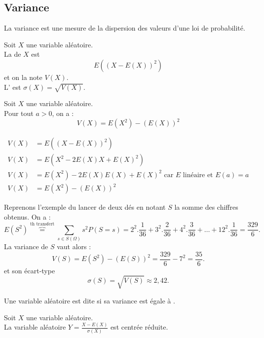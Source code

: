 \documentclass{book}
\begin{document}
\subsection{Variance}
La variance est une mesure de la dispersion des valeurs d'une loi de probabilité.
\begin{Definition}
Soit $X$ une variable aléatoire.\\
La  de $X$ est $$E\left( (X-E(X))^2\right)$$ et on la note $V(X)$.\\
L' est $\sigma(X) =\sqrt{V(X)}$.
\end{Definition}
\begin{Proposition}
Soit $X$ une variable aléatoire.\\
Pour tout $a>0$, on a :
\[ V(X) = E(X^2)-(E(X))^2 \]
\end{Proposition}
\begin{Demonstration}
$$\begin{aligned}
  V(X) &= E\left( (X-E(X))^2\right) \\
  V(X) &= E\left( X^2-2E(X)X + E(X)^2\right)\\
  V(X) &= E(X^2)-2E(X)E(X) + E(X)^2 \text{ car } E \text{ linéaire et }E(a)=a\\
  V(X) &= E(X^2)-(E(X))^2
\end{aligned}$$
\end{Demonstration}




\begin{Exemple}
Reprenons l'exemple du lancer de deux dés en notant $S$ la somme des chiffres obtenus. 
On a :
$$E(S^2 )\overbrace{=}^{\text{th transfert}} \sum_{s\in S (\Omega)} s^2P(S = s)=  2^2.\frac{1}{36}+3^2.\frac{2}{36}+4^2.\frac{3}{36}+\dots+12^2.\frac{1}{36}=\frac{329}{6}.$$
La variance de $S$ vaut alors :
$$V(S)=E(S^2 )-(E(S))^2=\frac{329}{6}-7^2=\frac{35}{6}.$$
et son écart-type
$$\sigma(S)=\sqrt{V(S)}\approx 2,42.$$
\end{Exemple}
\begin{Definition}[Réduite]
Une variable aléatoire est dite  si sa variance est égale à .
\end{Definition}
\begin{Exemple}
Soit $X$ une variable aléatoire.\\
La variable aléatoire $Y=\frac{X-E(X)}{\sigma(X)}$ est centrée réduite.
\end{Exemple}
\end{document}
